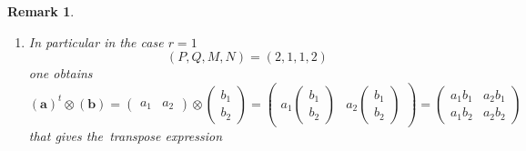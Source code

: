 \documentclass[aps,preprint]{revtex4}
\newtheorem{remark}[theorem]{Remark}
\begin{document}
\begin{remark}
\begin{enumerate}
\begin{enumerate}
\item In particular in the case $r=1$%
\begin{equation}
\left( P,Q,M,N\right) =\left( 2,1,1,2\right)
\end{equation}%
one obtains 
\begin{equation}
\left( \boldsymbol{a}\right) ^{t}\otimes \left( \boldsymbol{b}\right)
=\left( 
\begin{array}{cc}
a_{1} & a_{2}%
\end{array}%
\right) \otimes \left( 
\begin{array}{c}
b_{1} \\ 
b_{2}%
\end{array}%
\right) =\left( 
\begin{array}{cc}
a_{1}\left( 
\begin{array}{c}
b_{1} \\ 
b_{2}%
\end{array}%
\right) & a_{2}\left( 
\begin{array}{c}
b_{1} \\ 
b_{2}%
\end{array}%
\right)%
\end{array}%
\right) =\left( 
\begin{array}{cc}
a_{1}b_{1} & a_{2}b_{1} \\ 
a_{1}b_{2} & a_{2}b_{2}%
\end{array}%
\right)
\end{equation}%
that gives the\emph{\ transpose }expression


\end{enumerate}
\end{enumerate}
\end{remark}
\end{document}
